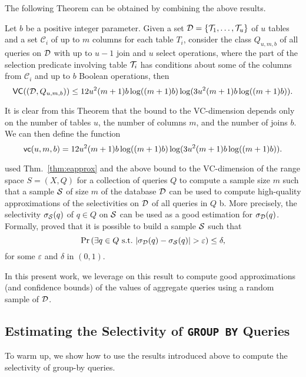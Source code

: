 The following Theorem can be obtained by combining the above results.

\begin{theorem}\label{thm:vcdimgenqueries}
Let $b$ be a positive integer parameter. Given a set
${\cal D}=\{{\cal T}_1,\dotsc,{\cal T}_u\}$ of $u$ tables and a set $\mathcal{C}_i$ of
up to $m$ columns for each table $T_i$, consider the class $Q_{u,m,b}$ of all
queries on ${\cal D}$ with up to $u-1$ join and $u$ select operations, where the
part of the selection predicate involving table ${\cal T}_i$ has conditions about
some of the columns from $\mathcal{C}_i$ and up to $b$ Boolean operations, then 
\[
\mathsf{VC}(({\cal D},Q_{u,m,b})) \leq 
12u^2(m+1)b\log((m+1)b)\log(3u^2(m+1)b\log((m+1)b)).\]
\end{theorem}
It is clear from this Theorem that the bound to the VC-dimension depends
only on the number of tables $u$, the number of columns $m$, and the number of
joins $b$. We can then define the function
\[
\mathsf{vc}(u,m,b)=12u^2(m+1)b\log((m+1)b)\log(3u^2(m+1)b\log((m+1)b)).\]

\citet{RiondatoACZU11} used Thm.~\ref{thm:eapprox} and the above bound to the
VC-dimension of the range space $S=(X,Q)$ for a collection of queries $Q$ to
compute a sample size $m$ such that a sample ${\cal S}$ of size $m$ of the database
${\cal D}$ can be used to compute high-quality approximations of the selectivities on
${\cal D}$ of all queries in $Q$ b. More precisely, the selectivity
$\sigma_{\cal S}(q)$ of $q\in Q$ on ${\cal S}$ can be used as a good estimation
for $\sigma_{\cal D}(q)$. Formally, \citet{RiondatoACZU11} proved that it is
possible to build a sample ${\cal S}$ such that
\[
\Pr\left(\exists q\in Q \text{ s.t.~}
|\selectivity_\Db(q)-\selectivity_\Sam(q)|>\varepsilon\right)\le\delta,
\]
for some $\varepsilon$ and $\delta$ in $(0,1)$.


In this present work, we leverage on this result to compute good approximations
(and confidence bounds) of the values of aggregate queries using a random sample
of ${\cal D}$.

\subsection{Estimating the Selectivity of \texttt{GROUP BY} Queries}\label{sec:groupby}
To warm up, we show how to use the results introduced above to compute the
selectivity of group-by queries.

